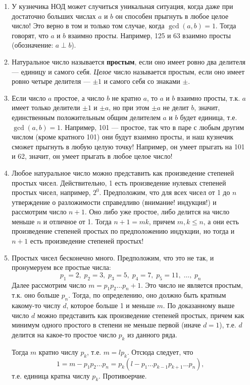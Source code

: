 \begin{enumerate}
\item У кузнечика НОД может случиться уникальная ситуация, когда даже при достаточно больших числах $a$ и $b$ он способен прыгнуть в любое целое число! Это верно в том и только том случае, когда $\gcd(a,b)=1$. Тогда говорят, что $a$ и $b$ взаимно просты. Например, 125 и 63 взаимно просты (обозначение: $a\perp b$).
\item Натуральное число называется \textbf{простым}, если оно имеет ровно два делителя --- единицу и самого себя. \textit{Целое} число называется простым, если оно имеет ровно четыре делителя --- $\pm 1$ и самого себя со знаками $\pm$.
\item Если число $a$ простое, а число $b$ не кратно $a$, то $a$ и $b$ взаимно просты, т.к. $a$ имеет только делители $\pm 1$ и $\pm a$, но при этом $\pm a$ не делит $b$, значит, единственным положительным общим делителем $a$ и $b$ будет единица, т.е. $\gcd(a,b)=1$.
 Например, 101 --- простое, так что в паре с любым другим числом (кроме кратного 101) они будут взаимно просты, и наш кузнечик сможет прыгнуть в любую целую точку! Например, он умеет прыгать на 101 и 62, значит, он умеет прыгать в любое целое число!

\item Любое натуральное число можно представить как произведение степеней простых чисел. Действительно, 1 есть произведение нулевых степеней простых чисел, например, $2^0$. Предположим, что для всех чисел от 1 до $n$ утверждение о разложимости справедливо (внимание! индукция!) и рассмотрим число $n+1$. Оно либо уже простое, либо делится на число меньше $n$ и отличное от 1. Тогда $n+1=mk$, причем $m,k\le n$, а они есть произведение степеней простых по предположению индукции, но тогда и $n+1$ есть произведение степеней простых!
\item Простых чисел бесконечно много. Предположим, что это не так, и пронумеруем все простые числа:
$$
p_1=2,\;p_2=3,\;p_3=5,\;p_4=7,\;p_5=11,\;\dots,\;p_n
$$
Далее рассмотрим число $m=p_1p_2\dots p_n+1$. Это число не является простым, т.к. оно больше $p_n$. Тогда, по определению, оно должно быть кратным какому-то числу $d$, которое больше 1 и меньше $m$. По доказанному выше число $d$ можно представить как произведение степеней простых, причем как минимум одного простого в степени не меньше первой (иначе $d=1$), т.е. $d$ делится на какое-то простое число $p_k$ из данного ряда.

Тогда $m$ кратно числу $p_k$, т.е. $m=lp_k$. Отсюда следует, что
$$
1=m-p_1p_2\dots p_n = p_k(l-p_1\dots p_{k-1}p_{k+1}\dots p_n),
$$
т.е. единица кратна числу $p_k$. Противоерчие.


\end{enumerate}
